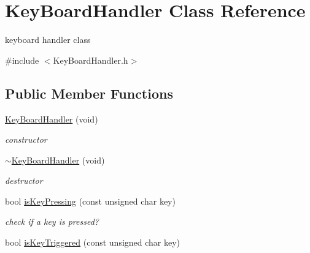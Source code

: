 \hypertarget{class_key_board_handler}{}\section{Key\+Board\+Handler Class Reference}
\label{class_key_board_handler}


keyboard handler class  




{\ttfamily \#include $<$Key\+Board\+Handler.\+h$>$}

\subsection*{Public Member Functions}
\begin{DoxyCompactItemize}
\item 
\hyperlink{class_key_board_handler_a46fad223915367625a9a6ea520840ea6}{Key\+Board\+Handler} (void)\hypertarget{class_key_board_handler_a46fad223915367625a9a6ea520840ea6}{}\label{class_key_board_handler_a46fad223915367625a9a6ea520840ea6}

\begin{DoxyCompactList}\small\item\em constructor \end{DoxyCompactList}\item 
\hyperlink{class_key_board_handler_a614e8a85e534690667be4a9f12bcae02}{$\sim$\+Key\+Board\+Handler} (void)\hypertarget{class_key_board_handler_a614e8a85e534690667be4a9f12bcae02}{}\label{class_key_board_handler_a614e8a85e534690667be4a9f12bcae02}

\begin{DoxyCompactList}\small\item\em destructor \end{DoxyCompactList}\item 
bool \hyperlink{class_key_board_handler_a36fc47555cdfcd33a112a42fc797e620}{is\+Key\+Pressing} (const unsigned char key)\hypertarget{class_key_board_handler_a36fc47555cdfcd33a112a42fc797e620}{}\label{class_key_board_handler_a36fc47555cdfcd33a112a42fc797e620}

\begin{DoxyCompactList}\small\item\em check if a key is pressed? \end{DoxyCompactList}\item 
bool \hyperlink{class_key_board_handler_aeda4d8cbf4f2269fc78e0daa90e5c4ea}{is\+Key\+Triggered} (const unsigned char key)\hypertarget{class_key_board_handler_aeda4d8cbf4f2269fc78e0daa90e5c4ea}{}\label{class_key_board_handler_aeda4d8cbf4f2269fc78e0daa90e5c4ea}


\end{DoxyCompactItemize}
